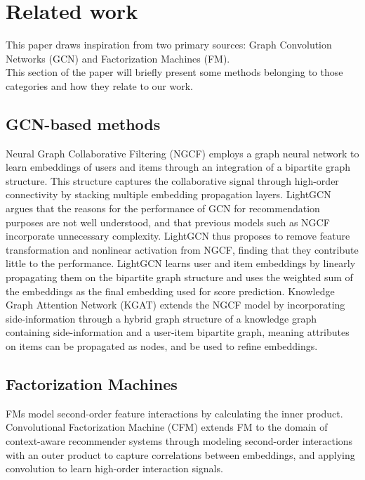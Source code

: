 \section{Related work}\label{sec:relatedwork}
This paper draws inspiration from two primary sources: Graph Convolution Networks (GCN) and Factorization Machines (FM).\\
This section of the paper will briefly present some methods belonging to those categories and how they relate to our work.

\subsection{GCN-based methods}
Neural Graph Collaborative Filtering (NGCF) \cite{NGCF} employs a graph neural network to learn embeddings of users and items through an integration of a bipartite graph structure.
This structure captures the collaborative signal through high-order connectivity by stacking multiple embedding propagation layers.
LightGCN \cite{LightGCN} argues that the reasons for the performance of GCN for recommendation purposes are not well understood, and that previous models such as NGCF incorporate unnecessary complexity.
LightGCN thus proposes to remove feature transformation and nonlinear activation from NGCF, finding that they contribute little to the performance.
LightGCN learns user and item embeddings by linearly propagating them on the bipartite graph structure and uses the weighted sum of the embeddings as the final embedding used for score prediction.
Knowledge Graph Attention Network (KGAT) \cite{KGAT} extends the NGCF model by incorporating side-information through a hybrid graph structure of a knowledge graph containing side-information and a user-item bipartite graph, meaning attributes on items can be propagated as nodes, and be used to refine embeddings.

\subsection{Factorization Machines}
FMs \cite{fmrendle} model second-order feature interactions by calculating the inner product.
Convolutional Factorization Machine (CFM) \cite{CFM} extends FM to the domain of context-aware recommender systems through modeling second-order interactions with an outer product to capture correlations between embeddings, and applying convolution to learn high-order interaction signals.
